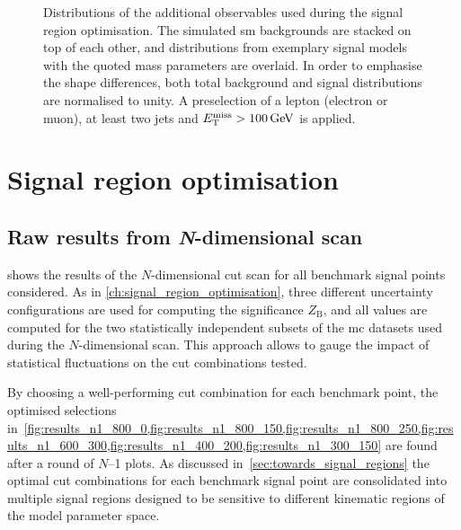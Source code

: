 \begin{figure}
\begin{subfigure}[b]{0.5\linewidth}
	\end{subfigure}
	\caption{Distributions of the additional observables used during the signal region optimisation. The simulated \gls{sm} backgrounds are stacked on top of each other, and distributions from exemplary signal models with the quoted mass parameters are overlaid. In order to emphasise the shape differences, both total background and signal distributions are normalised to unity. A preselection of a lepton (electron or muon), at least two jets and $\etmiss > \SI{100}{\GeV}$ is applied.}\label{fig:additional_presel_plots}
\end{figure}

\section{Signal region optimisation}\label{app:n-1_plots_cut_opt}

\graphicspath{{chapter-optimisation/Figs/Vector/}{chapter-optimisation/Figs/}}

\subsection{Raw results from \textit{N}-dimensional scan}
 shows the results of the $N$-dimensional cut scan for all benchmark signal points considered. As in \cref{ch:signal_region_optimisation}, three different uncertainty configurations are used for computing the significance $Z_\mathrm{B}$, and all values are computed for the two statistically independent subsets of the \gls{mc} datasets used during the $N$-dimensional scan. This approach allows to gauge the impact of statistical fluctuations on the cut combinations tested.

By choosing a well-performing cut combination for each benchmark point, the optimised selections in~\cref{fig:results_n1_800_0,fig:results_n1_800_150,fig:results_n1_800_250,fig:results_n1_600_300,fig:results_n1_400_200,fig:results_n1_300_150} are found after a round of $N$--1 plots. As discussed in~\cref{sec:towards_signal_regions} the optimal cut combinations for each benchmark signal point are consolidated into multiple signal regions designed to be sensitive to different kinematic regions of the model parameter space. 

